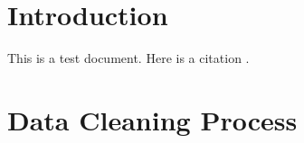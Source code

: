 \documentclass[a4paper,12pt]{report}
\begin{document}
\chapter{Introduction}

This is a test document. Here is a citation \cite{samplebook}.

\chapter{Data Cleaning Process}

\nocite{*}

\end{document}
